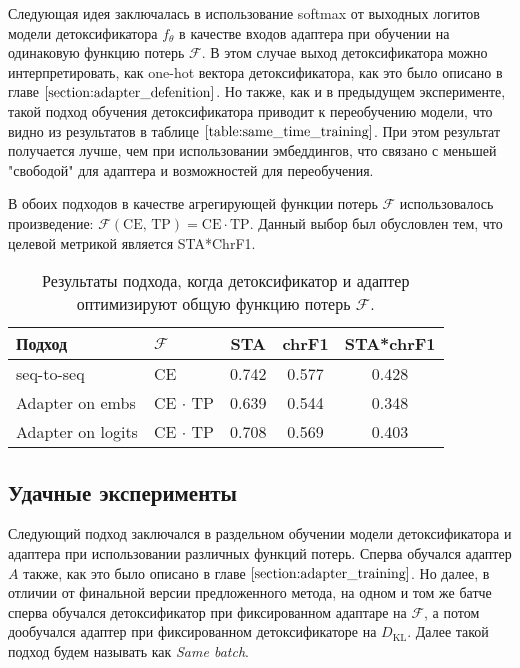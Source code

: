 Следующая идея заключалась в использование softmax от выходных логитов модели детоксификатора $f_{\theta}$ в качестве входов адаптера при обучении на одинаковую функцию потерь $\mathcal{F}$. 
В этом случае выход детоксификатора можно интерпретировать, как one-hot вектора детоксификатора, как это было описано в главе $\ref{section:adapter_defenition}$.
Но также, как и в предыдущем эксперименте, такой подход обучения детоксификатора приводит к переобучению модели, что видно из результатов в таблице $\ref{table:same_time_training}$.
При этом результат получается лучше, чем при использовании эмбеддингов, что связано с меньшей "свободой" для адаптера и возможностей для переобучения. 

В обоих подходов в качестве агрегирующей функции потерь $\mathcal{F}$ использовалось произведение: $\mathcal{F}(\text{CE, TP}) = \text{CE} \cdot \text{TP}$. 
Данный выбор был обусловлен тем, что целевой метрикой является STA*ChrF1.

\begin{table}[ht]
\centering
 \begin{tabular}{|l l|c c c|} 
 \hline
 Подход & $\mathcal{F}$ & STA & chrF1 & STA*chrF1 \\ [0.5ex] 
 \hline
 seq-to-seq & CE & 0.742 & 0.577 & 0.428  \\ 
 Adapter on embs & CE $\cdot$ TP & 0.639 & 0.544 & 0.348 \\
 Adapter on logits  & CE $\cdot$ TP & 0.708 & 0.569 & 0.403 \\
  \hline
 \end{tabular}
\caption{Результаты подхода, когда детоксификатор и адаптер оптимизируют общую функцию потерь $\mathcal{F}$.}
\label{table:same_time_training}
\end{table}

\subsection{Удачные эксперименты}
Следующий подход заключался в раздельном обучении модели детоксификатора и адаптера при использовании различных функций потерь. 
Сперва обучался адаптер $A$ также, как это было описано в главе $\ref{section:adapter_training}$. 
Но далее, в отличии от финальной версии предложенного метода, на одном и том же батче сперва обучался детоксификатор при фиксированном адаптаре на $\mathcal{F}$, а потом дообучался адаптер при фиксированном детоксификаторе на $D_{\text{KL}}$.
Далее такой подход будем называть как \textit{Same batch}.

